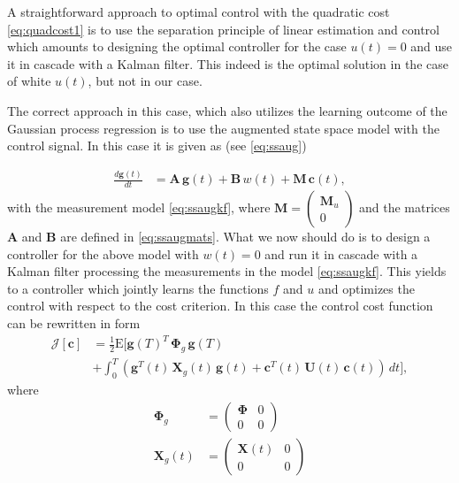 \documentclass[journal]{IEEEtran}
\begin{document}
A straightforward approach to optimal control with the quadratic cost \eqref{eq:quadcost1} is to use the separation principle of linear estimation and control which amounts to designing the optimal controller for the case $u(t) = 0$ and use it in cascade with a Kalman filter. This indeed is the optimal solution in the case of white $u(t)$, but not in our case.

The correct approach in this case, which also utilizes the learning outcome of the Gaussian process regression is to use the augmented state space model with the control signal. In this case it is given as (see \eqref{eq:ssaug})

\begin{equation}
\begin{split}
  \frac{d\mathbf{g}(t)}{dt}
  &= \mathbf{A} \, \mathbf{g}(t)
  + \mathbf{B} \, w(t) + \mathbf{M} \, \mathbf{c}(t),
\end{split}
\end{equation}
%
with the measurement model \eqref{eq:ssaugkf}, where $ \mathbf{M} = \begin{pmatrix} \mathbf{M}_u \\ 0 \end{pmatrix}$ and the matrices $\mathbf{A}$ and $\mathbf{B}$ are defined in \eqref{eq:ssaugmats}. What we now should do is to design a controller for the above model with $w(t) = 0$ and run it in cascade with a Kalman filter processing the measurements in the model \eqref{eq:ssaugkf}. This yields to a controller which jointly learns the functions $f$ and $u$ and optimizes the control with respect to the cost criterion. In this case the control cost function can be rewritten in form
%
\begin{equation}
\begin{split}
  \mathcal{J}[\mathbf{c}] &= \frac{1}{2} \mathrm{E} \Big[
    \mathbf{g}(T)^T \, \boldsymbol{\Phi}_g \, \mathbf{g}(T) \\
   &+ \int_0^T
   (\mathbf{g}^T(t) \, \mathbf{X}_g(t) \, \mathbf{g}(t)
  + \mathbf{c}^T(t) \, \mathbf{U}(t) \, \mathbf{c}(t)) \, dt \Big],
\end{split}
\end{equation}
%
where
%
\begin{equation}
\begin{split}
 \boldsymbol{\Phi}_g &= \begin{pmatrix}
   \boldsymbol{\Phi} & 0 \\ 0 & 0
 \end{pmatrix} \\
 \mathbf{X}_g(t) &= \begin{pmatrix}
   \mathbf{X}(t) & 0 \\ 0 & 0
 \end{pmatrix} \\
\end{split}
\end{equation}
\end{document}
